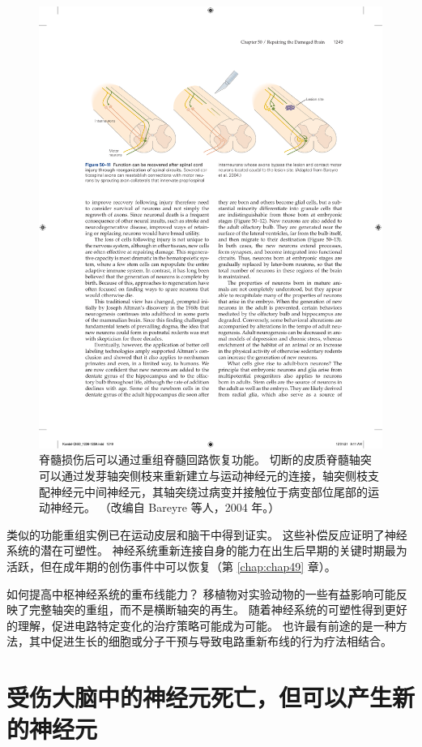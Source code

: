 \begin{figure}[htbp]
	\centering
	\includegraphics[width=0.9\linewidth]{chap50/fig_50_11}
	\caption{脊髓损伤后可以通过重组脊髓回路恢复功能。 切断的皮质脊髓轴突可以通过发芽轴突侧枝来重新建立与运动神经元的连接，轴突侧枝支配神经元中间神经元，其轴突绕过病变并接触位于病变部位尾部的运动神经元。 （改编自 Bareyre 等人，2004 年。）}
	\label{fig:50_11}
\end{figure}

类似的功能重组实例已在运动皮层和脑干中得到证实。 这些补偿反应证明了神经系统的潜在可塑性。 神经系统重新连接自身的能力在出生后早期的关键时期最为活跃，但在成年期的创伤事件中可以恢复（第 \ref{chap:chap49} 章）。

如何提高中枢神经系统的重布线能力？ 移植物对实验动物的一些有益影响可能反映了完整轴突的重组，而不是横断轴突的再生。 随着神经系统的可塑性得到更好的理解，促进电路特定变化的治疗策略可能成为可能。 也许最有前途的是一种方法，其中促进生长的细胞或分子干预与导致电路重新布线的行为疗法相结合。

\section{受伤大脑中的神经元死亡，但可以产生新的神经元}

